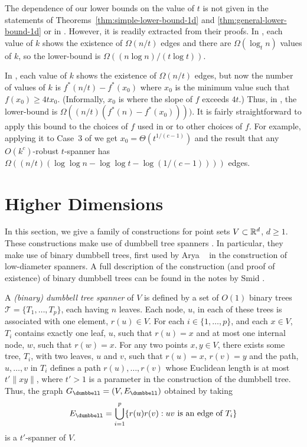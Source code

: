 \documentclass[final]{siamltex}
\begin{document}
\begin{rem}
  The dependence of our lower bounds on the value of $t$ is not
  given in the statements of Theorems~\ref{thm:simple-lower-bound-1d}
  and \ref{thm:general-lower-bound-1d} or in .
  However, it is readily extracted from their proofs.  In
  , each value of $k$ shows the existence
  of $\Omega(n/t)$ edges and there are $\Omega(\log_t n)$ values of $k$,
  so the lower-bound is $\Omega((n\log n)/(t\log t))$.

  In , each value of $k$ shows the
  existence of $\Omega(n/t)$ edges, but now the number of values of $k$
  is $f^*(n/t) - f^*(x_0)$ where $x_0$ is the minimum value such that
  $f(x_0)\ge 4tx_0$. (Informally, $x_0$ is where the slope of $f$ exceeds
  $4t$.)  Thus, in , the lower-bound is
  $\Omega((n/t)(f^*(n)-f^*(x_0))))$.  It is fairly straightforward to
  apply this bound to the choices of $f$ used in 
  or to other choices of $f$.  For example, applying it to Case~3 of
   we get $x_0=\Theta(t^{1/(c-1)})$ and the result
  that any $O(k^c)$-robust $t$-spanner has $\Omega((n/t)(\log\log n -
  \log\log t - \log (1/(c-1))))$ edges.
\end{rem}


\section{Higher Dimensions}

In this section, we give a family of constructions for point sets
$V\subset\mathbb{R}^d$, $d\ge 1$.  These constructions make use of dumbbell
tree spanners \cite[Chapter~11]{ns07}.  In particular, they make use
of binary dumbbell trees, first used by Arya \etal\ \cite{admss95} in
the construction of low-diameter spanners.  A full description of the
construction (and proof of existence) of binary dumbbell trees can be
found in the notes by Smid \cite{s12}.

A \emph{(binary) dumbbell tree spanner} of $V$ is defined by a set of
$O(1)$ binary trees $\mathcal{T}=\{T_1,\ldots,T_p\}$, each having $n$
leaves.  Each node, $u$, in each of these trees is associated with one
element, $r(u)\in V$.  For each $i\in\{1,\ldots,p\}$, and each $x\in V$,
$T_i$ contains exactly one leaf, $u$, such that $r(u)=x$ and at most
one internal node, $w$, such that $r(w)=x$.
For any two points $x,y\in V$, there exists some tree, $T_i$,
with two leaves, $u$ and $v$, such that $r(u)=x$, $r(v)=y$ and
the path, $u,\ldots,v$ in $T_i$ defines a path $r(u),\ldots,r(v)$
whose Euclidean length is at most $t'\|xy\|$, where $t'>1$ is a
parameter in the construction of the dumbbell tree.  Thus, the graph
$G_\dumbbell=(V,E_\dumbbell)$ obtained by taking
\[
   E_\dumbbell = \bigcup_{i=1}^p\{r(u)r(v) : \text{$uv$ is an edge of $T_i$} \}
\]
is a $t'$-spanner of $V$.  
\end{document}
